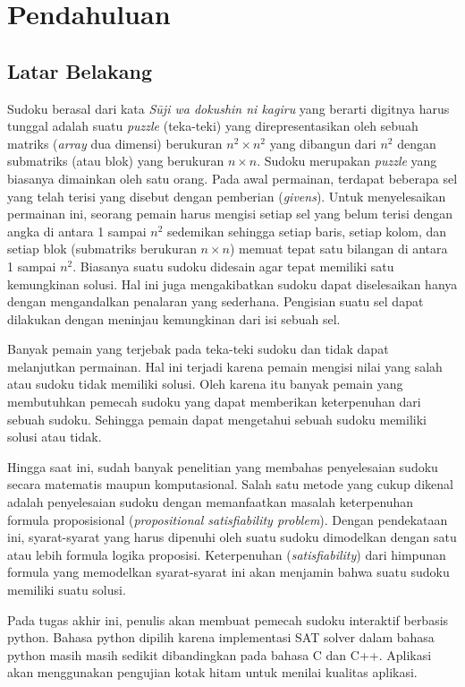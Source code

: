 \chapter{Pendahuluan}

\section{Latar Belakang}

Sudoku berasal dari kata \textit{Sūji wa dokushin ni kagiru} yang berarti digitnya harus tunggal adalah suatu \textit{puzzle} (teka-teki) yang direpresentasikan oleh sebuah matriks (\textit{array}
dua dimensi) berukuran ${n^2 \times n^2}$  yang dibangun dari ${n^2}$ dengan submatriks (atau blok)
yang berukuran ${n \times n}$. Sudoku merupakan \textit{puzzle}
yang biasanya dimainkan oleh satu orang.  Pada
awal permainan, terdapat beberapa sel yang telah terisi yang disebut dengan pemberian
(\textit{givens}). Untuk menyelesaikan permainan ini, seorang pemain harus mengisi setiap sel yang
belum terisi dengan angka di antara 1 sampai
$n^2$ sedemikan sehingga setiap baris, setiap kolom,
dan setiap blok (submatriks berukuran $n \times n$) memuat tepat satu bilangan di antara 1 sampai $n^2$. Biasanya suatu sudoku didesain agar tepat memiliki satu kemungkinan solusi. Hal
ini juga mengakibatkan sudoku dapat diselesaikan hanya dengan mengandalkan penalaran
yang sederhana. Pengisian suatu sel dapat dilakukan dengan meninjau kemungkinan dari
isi sebuah sel.

Banyak pemain yang terjebak pada teka-teki sudoku dan tidak dapat melanjutkan permainan. Hal ini terjadi karena pemain mengisi nilai yang salah atau sudoku tidak memiliki solusi. Oleh karena itu banyak pemain yang membutuhkan pemecah sudoku yang dapat memberikan keterpenuhan dari sebuah sudoku. Sehingga pemain dapat mengetahui sebuah sudoku memiliki solusi atau tidak.

Hingga saat ini, sudah banyak penelitian yang membahas penyelesaian sudoku secara
matematis maupun komputasional. Salah satu metode yang cukup dikenal adalah penyelesaian
sudoku dengan memanfaatkan masalah keterpenuhan formula proposisional (\textit{propositional satisfiability problem}). Dengan pendekataan ini, syarat-syarat yang
harus dipenuhi oleh suatu sudoku dimodelkan dengan satu atau lebih formula logika proposisi.
Keterpenuhan (\textit{satisfiability}) dari himpunan formula yang memodelkan syarat-syarat
ini akan menjamin bahwa suatu sudoku memiliki suatu solusi.

Pada tugas akhir ini, penulis akan membuat pemecah sudoku interaktif berbasis python. Bahasa python dipilih
karena implementasi SAT solver dalam bahasa python masih masih sedikit dibandingkan pada bahasa C dan C++. Aplikasi akan menggunakan pengujian kotak hitam untuk menilai kualitas aplikasi.

